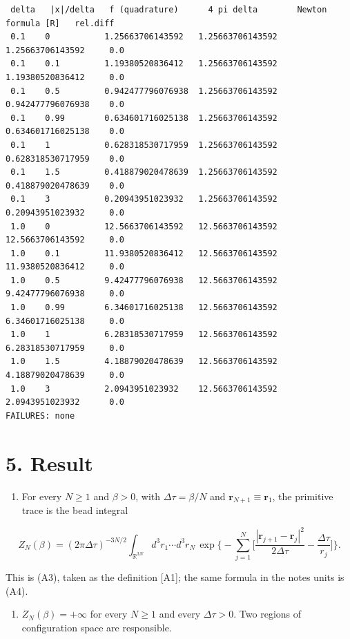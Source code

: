 \documentclass[11pt,a4paper]{article}
\providecommand{\tightlist}{\setlength{\itemsep}{0pt}\setlength{\parskip}{0pt}}
\begin{document}
\begin{lstlisting}
 delta   |x|/delta   f (quadrature)      4 pi delta        Newton formula [R]   rel.diff
 0.1    0           1.25663706143592   1.25663706143592  1.25663706143592     0.0
 0.1    0.1         1.19380520836412   1.25663706143592  1.19380520836412     0.0
 0.1    0.5         0.942477796076938  1.25663706143592  0.942477796076938    0.0
 0.1    0.99        0.634601716025138  1.25663706143592  0.634601716025138    0.0
 0.1    1           0.628318530717959  1.25663706143592  0.628318530717959    0.0
 0.1    1.5         0.418879020478639  1.25663706143592  0.418879020478639    0.0
 0.1    3           0.20943951023932   1.25663706143592  0.20943951023932     0.0
 1.0    0           12.5663706143592   12.5663706143592  12.5663706143592     0.0
 1.0    0.1         11.9380520836412   12.5663706143592  11.9380520836412     0.0
 1.0    0.5         9.42477796076938   12.5663706143592  9.42477796076938     0.0
 1.0    0.99        6.34601716025138   12.5663706143592  6.34601716025138     0.0
 1.0    1           6.28318530717959   12.5663706143592  6.28318530717959     0.0
 1.0    1.5         4.18879020478639   12.5663706143592  4.18879020478639     0.0
 1.0    3           2.0943951023932    12.5663706143592  2.0943951023932      0.0
FAILURES: none
\end{lstlisting}

\hypertarget{result}{%
\section{5. Result}\label{result}}

\begin{enumerate}
\def\labelenumi{(\alph{enumi})}
\tightlist
\item
  For every \(N\ge1\) and \(\beta>0\), with \(\Delta\tau=\beta/N\) and \(\mathbf r_{N+1}\equiv\mathbf r_1\), the primitive trace is the bead integral
\end{enumerate}

\[
Z_N(\beta)=(2\pi\Delta\tau)^{-3N/2}\int_{\mathbb R^{3N}}d^3r_1\cdots d^3r_N\,\exp\Big\{-\sum_{j=1}^N\Big[\frac{|\mathbf r_{j+1}-\mathbf r_j|^2}{2\Delta\tau}-\frac{\Delta\tau}{r_j}\Big]\Big\}.
\]

This is (A3), taken as the definition {[}A1{]}; the same formula in the notes\textquotesingle{} units is (A4).

\begin{enumerate}
\def\labelenumi{(\alph{enumi})}
\setcounter{enumi}{1}
\tightlist
\item
  \(Z_N(\beta)=+\infty\) for every \(N\ge1\) and every \(\Delta\tau>0\). Two regions of configuration space are responsible.
\end{enumerate}
\end{document}
